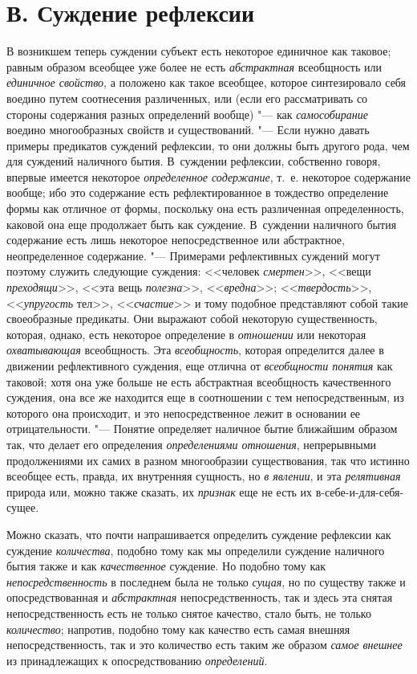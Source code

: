 \section[В. Суждение рефлексии]{В. Суждение рефлексии}
В возникшем теперь суждении субъект есть некоторое единичное
как таковое; равным образом всеобщее уже более не есть
{\em абстрактная}
всеобщность или
{\em единичное свойство},
а положено как такое всеобщее, которое синтезировало себя
воедино путем соотнесения различенных, или (если его рассматривать со
стороны содержания разных определений вообще) "--- как
{\em самособирание}
воедино многообразных свойств и существований. "---
Если нужно давать примеры предикатов суждений рефлексии, то
они должны быть другого рода, чем для суждений наличного бытия. В~суждении
рефлексии, собственно говоря, впервые имеется некоторое
{\em определенное содержание},
т.~е. некоторое содержание вообще; ибо это содержание есть
рефлектированное в тождество определение формы как отличное от формы,
поскольку она есть различенная определенность, каковой она еще продолжает
быть как суждение. В~суждении наличного бытия содержание есть лишь
некоторое непосредственное или абстрактное, неопределенное содержание. "---
Примерами рефлективных суждений могут поэтому служить
следующие суждения: <<человек
{\em смертен}>>, <<вещи
{\em преходящи}>>, <<эта
вещь {\em полезна}>>,
<<{\em вредна}>>;
<<{\em твердость}>>,
<<{\em упругость} тел>>,
<<{\em счастие}>> и тому
подобное представляют собой такие своеобразные предикаты. Они выражают
собой некоторую существенность, которая, однако, есть некоторое определение
в {\em отношении} или
некоторая {\em охватывающая}
всеобщность. Эта
{\em всеобщность},
которая определится далее в движении рефлективного суждения,
еще отлична от {\em всеобщности
понятия} как таковой; хотя она уже больше не есть
абстрактная всеобщность качественного суждения, она все же находится еще в
соотношении с тем непосредственным, из которого она происходит, и это
непосредственное лежит в основании ее отрицательности. "---
Понятие определяет наличное бытие ближайшим образом так, что
делает его определения
{\em определениями отношения},
непрерывными продолжениями их самих в разном многообразии
существования, так что истинно всеобщее есть, правда, их внутренняя
сущность, но {\em в явлении},
и эта {\em релятивная}
природа или, можно также сказать, их
{\em признак} еще не есть
их в-себе-и-для-себя-сущее.

Можно сказать, что почти напрашивается определить суждение
рефлексии как суждение
{\em количества}, подобно
тому как мы определили суждение наличного бытия также и как
{\em качественное}
суждение. Но подобно тому как
{\em непосредственность}
в последнем была не только
{\em сущая}, но по
существу также и опосредствованная и
{\em абстрактная}
непосредственность, так и здесь эта снятая непосредственность
есть не только снятое качество, стало быть, не только
{\em количество};
напротив, подобно тому как качество есть самая внешняя
непосредственность, так и это количество есть таким же образом
{\em самое внешнее} из
принадлежащих к опосредствованию
{\em определений}.

